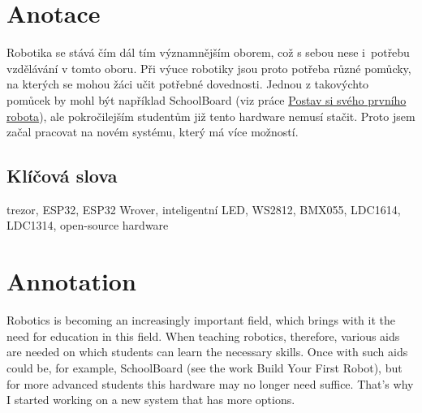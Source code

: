 \documentclass{template/socthesis}
\author{Tomáš Vavrinec} %
\begin{document}

\maketitle %



\pagestyle{empty}

\section*{Anotace}
\color{black}

Robotika se stává čím dál tím významnějším oborem, což s sebou nese i~potřebu vzdělávání v tomto oboru.
Při výuce robotiky jsou proto potřeba různé pomůcky, na kterých se mohou žáci učit potřebné dovednosti. Jednou z takovýchto pomůcek 
by mohl být například SchoolBoard (viz práce \href{https://github.com/TVavrinec/SOC-text/blob/master/SOČ.pdf}{Postav si svého prvního robota}), 
ale pokročilejším studentům již tento hardware nemusí stačit. Proto jsem začal pracovat na novém systému, který má více možností.

\subsection*{Klíčová slova}

\color{black}

trezor, ESP32, ESP32 Wrover, inteligentní LED, WS2812, BMX055, LDC1614, LDC1314, open-source hardware

\newpage %

\vspace{20mm}

\section*{Annotation}
\color{black}

Robotics is becoming an increasingly important field, which brings with it the need for education in this field.
When teaching robotics, therefore, various aids are needed on which students can learn the necessary skills. Once with such aids
could be, for example, SchoolBoard (see the work Build Your First Robot), but for more advanced students this hardware may no 
longer need suffice. That's why I started working on a new system that has more options.
\end{document}
